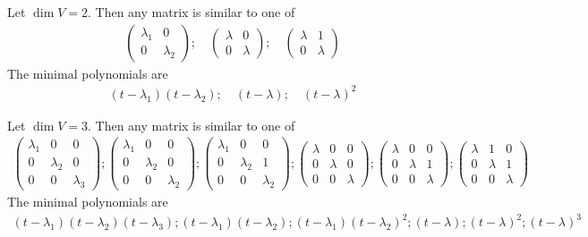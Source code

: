 \begin{example}
	Let $\dim V = 2$.
	Then any matrix is similar to one of
	\begin{align*}
		\begin{pmatrix}
			\lambda_1 & 0         \\
			0         & \lambda_2
		\end{pmatrix};\quad
		\begin{pmatrix}
			\lambda & 0       \\
			0       & \lambda
		\end{pmatrix};\quad
		\begin{pmatrix}
			\lambda & 1       \\
			0       & \lambda
		\end{pmatrix}
	\end{align*}
	The minimal polynomials are
	\begin{align*}
		(t-\lambda_1)(t-\lambda_2);\quad (t-\lambda);\quad (t-\lambda)^2
	\end{align*}
\end{example}

\begin{example}
	Let $\dim V = 3$.
	Then any matrix is similar to one of
	\begin{align*}
		\begin{pmatrix}
		\lambda_1 & 0 & 0 \\
		0 & \lambda_2 & 0 \\
		0 & 0 & \lambda_3
		\end{pmatrix};
		\begin{pmatrix}
			\lambda_1 & 0 & 0 \\
			0 & \lambda_2 & 0 \\
			0 & 0 & \lambda_2
		\end{pmatrix};
		\begin{pmatrix}
			\lambda_1 & 0 & 0 \\
			0 & \lambda_2 & 1 \\
			0 & 0 & \lambda_2
		\end{pmatrix};
		\begin{pmatrix}
			\lambda & 0 & 0 \\
			0 & \lambda & 0 \\
			0 & 0 & \lambda
		\end{pmatrix};
		\begin{pmatrix}
			\lambda & 0 & 0 \\
			0 & \lambda & 1 \\
			0 & 0 & \lambda
		\end{pmatrix};
		\begin{pmatrix}
			\lambda & 1 & 0 \\
			0 & \lambda & 1 \\
			0 & 0 & \lambda
		\end{pmatrix}
	\end{align*}
	The minimal polynomials are
	\begin{align*}
		(t-\lambda_1)(t-\lambda_2)(t-\lambda_3); (t-\lambda_1)(t-\lambda_2); (t-\lambda_1)(t-\lambda_2)^2; (t-\lambda); (t-\lambda)^2; (t-\lambda)^3
	\end{align*}
\end{example}


